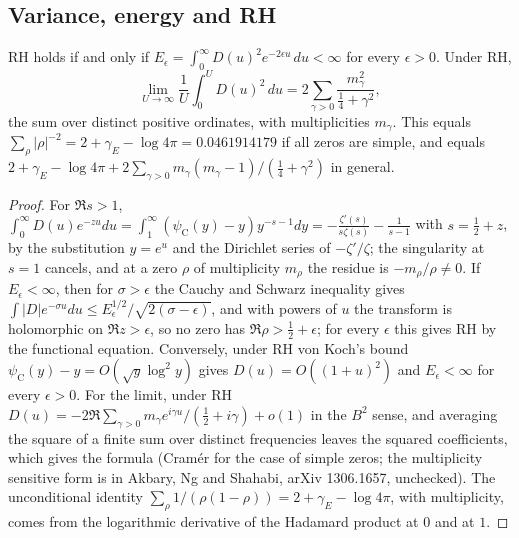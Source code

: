 \subsection{Variance, energy and RH}

\begin{proposition}\label{wt:prop:energy}
RH holds if and only if $E_\epsilon=\int_0^\infty D(u)^2e^{-2\epsilon u}\,du<\infty$ for every $\epsilon>0$. Under RH,
\[
\lim_{U\to\infty}\frac1U\int_0^UD(u)^2\,du=2\sum_{\gamma>0}\frac{m_\gamma^2}{\frac14+\gamma^2},
\]
the sum over distinct positive ordinates, with multiplicities $m_\gamma$. This equals $\sum_\rho|\rho|^{-2}=2+\gamma_E-\log4\pi=0.0461914179$ if all zeros are simple, and equals $2+\gamma_E-\log4\pi+2\sum_{\gamma>0}m_\gamma(m_\gamma-1)/(\frac14+\gamma^2)$ in general.
\end{proposition}

\begin{proof}
For $\Re s>1$, $\int_0^\infty D(u)e^{-zu}du=\int_1^\infty(\psi_{\mathrm C}(y)-y)y^{-s-1}dy=-\frac{\zeta'(s)}{s\zeta(s)}-\frac1{s-1}$ with $s=\frac12+z$, by the substitution $y=e^u$ and the Dirichlet series of $-\zeta'/\zeta$; the singularity at $s=1$ cancels, and at a zero $\rho$ of multiplicity $m_\rho$ the residue is $-m_\rho/\rho\ne0$. If $E_\epsilon<\infty$, then for $\sigma>\epsilon$ the Cauchy and Schwarz inequality gives $\int|D|e^{-\sigma u}du\le E_\epsilon^{1/2}/\sqrt{2(\sigma-\epsilon)}$, and with powers of $u$ the transform is holomorphic on $\Re z>\epsilon$, so no zero has $\Re\rho>\frac12+\epsilon$; for every $\epsilon$ this gives RH by the functional equation. Conversely, under RH von Koch's bound $\psi_{\mathrm C}(y)-y=O(\sqrt y\log^2y)$ gives $D(u)=O((1+u)^2)$ and $E_\epsilon<\infty$ for every $\epsilon>0$. For the limit, under RH $D(u)=-2\Re\sum_{\gamma>0}m_\gamma e^{i\gamma u}/(\frac12+i\gamma)+o(1)$ in the $B^2$ sense, and averaging the square of a finite sum over distinct frequencies leaves the squared coefficients, which gives the formula (Cram\'er \cite{Cramer} for the case of simple zeros; the multiplicity sensitive form is in Akbary, Ng and Shahabi, arXiv 1306.1657, unchecked). %
The unconditional identity $\sum_\rho1/(\rho(1-\rho))=2+\gamma_E-\log4\pi$, with multiplicity, comes from the logarithmic derivative of the Hadamard product at $0$ and at $1$.
\end{proof}

